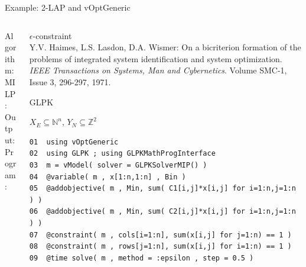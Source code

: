 \documentclass[10pt,xcolor=dvipsnames]{beamer}
\newcommand{\mN}{\mathbb{N}}
\newcommand{\Z}{\mathbb{Z}}
\begin{document}
\begin{frame}[fragile=singleslide]{Example: 2-LAP and vOptGeneric}

\vspace{5mm}
\begin{columns}
%
\begin{column}{0.15\textwidth}
Algorithm: \\
\vspace{18mm}
MILP:\\  
\vspace{2mm}
Output: \\
\vspace{6mm}
Program:
\vspace{30mm}
\end{column}
\begin{column}{0.85\textwidth}
         $\epsilon$-constraint \vspace{1mm}\\
         {\footnotesize Y.V. Haimes, L.S. Lasdon, D.A. Wismer: On a bicriterion formation of the problems of integrated system identification and system optimization. 
         \textit{IEEE Transactions on Systems, Man and Cybernetics}. Volume SMC-1, Issue 3, 296-297, 1971.\\}
\medskip

         GLPK
\medskip

$X_E \subseteq \mN^n$, $Y_N \subseteq \Z^2$
\vspace{3mm}

{\footnotesize
\begin{verbatim}
01  using vOptGeneric
02  using GLPK ; using GLPKMathProgInterface
03  m = vModel( solver = GLPKSolverMIP() )
04  @variable( m , x[1:n,1:n] , Bin )
05  @addobjective( m , Min, sum( C1[i,j]*x[i,j] for i=1:n,j=1:n ) )
06  @addobjective( m , Min, sum( C2[i,j]*x[i,j] for i=1:n,j=1:n ) )
07  @constraint( m , cols[i=1:n], sum(x[i,j] for j=1:n) == 1 )
08  @constraint( m , rows[j=1:n], sum(x[i,j] for i=1:n) == 1 )
09  @time solve( m , method = :epsilon , step = 0.5 )
\end{verbatim}
}


          
\end{column}
%
\end{columns}         

       
\end{frame}
\end{document}

